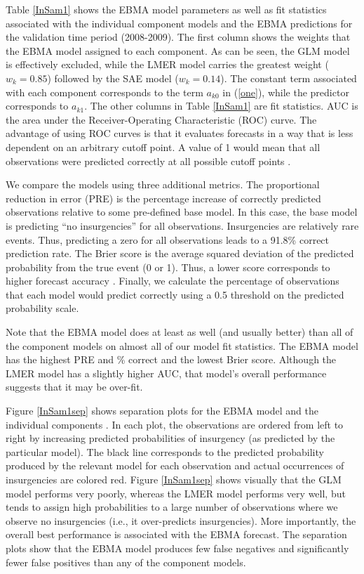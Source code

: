 \documentclass[12pt,fullpage,endnotes]{article}
\begin{document}
Table \ref{InSam1} shows the EBMA model parameters as well as fit
statistics associated with the individual component models and the
EBMA predictions for the validation time period (2008-2009). The first
column shows the weights that the EBMA model assigned to each
component. As can be seen, the GLM model is effectively excluded,
while the LMER model carries the greatest weight ($w_k=0.85$)
followed by the SAE model ($w_k = 0.14$).  The constant term
associated with each component corresponds to the term $a_{k0}$ in
(\ref{one}), while the predictor corresponds to $a_{k1}$.  The other
columns in Table \ref{InSam1} are fit statistics.  AUC is the area
under the Receiver-Operating Characteristic (ROC) curve. The advantage
of using ROC curves is that it evaluates forecasts in a way that is
less dependent on an arbitrary cutoff point.  A value of 1 would mean
that all observations were predicted correctly at all possible cutoff
points \citep{King:Zeng:2001}.

  
We compare the models using three additional metrics.  The
proportional reduction in error (PRE) is the percentage increase of
correctly predicted observations relative to some pre-defined base
model. In this case, the base model is predicting ``no insurgencies''
for all observations.  Insurgencies are relatively rare events.  Thus,
predicting a zero for all observations leads to a 91.8\% correct
prediction rate. The Brier score is the average squared deviation of
the predicted probability from the true event (0 or 1).  Thus, a lower
score corresponds to higher forecast accuracy \citep{Brier:1950}.
Finally, we calculate the percentage of observations that each model
would predict correctly using a 0.5 threshold on the predicted
probability scale.


Note that the EBMA model does at least as well (and usually better)
than all of the component models on almost all of our model fit statistics.
The EBMA model has the highest PRE and \% correct and the lowest Brier
score.  Although the LMER model has a slightly higher AUC, that
model's overall performance suggests that it may be over-fit.


Figure \ref{InSam1sep} shows separation plots for the EBMA model and
the individual components \citep{Greenhill:2011}. In each plot, the
observations are ordered from left to right by increasing predicted
probabilities of insurgency (as predicted by the particular
model). The black line corresponds to the predicted probability
produced by the relevant model for each observation and actual
occurrences of insurgencies are colored red.  Figure \ref{InSam1sep}
shows visually that the GLM model performs very poorly, whereas the
LMER model performs very well, but tends to assign high probabilities
to a large number of observations where we observe no insurgencies
(i.e., it over-predicts insurgencies).  More importantly, the overall
best performance is associated with the EBMA forecast. The separation
plots show that the EBMA model produces few false negatives and
significantly fewer false positives than any of the component models.
\end{document}
